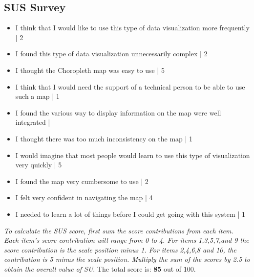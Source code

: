 \documentclass[twocolumn, letterpaper,13pt]{scrartcl}
\begin{document}
    \subsection*{SUS Survey}
    \begin{itemize}
        \item I think that I would like to use this type of data visualization more frequently | 2
        \item I found this type of data visualization unnecessarily complex | 2
        \item I thought the Choropleth map was easy to use | 5
        \item I think that I would need the support of a technical person to be able to use such a map | 1
        \item I found the various way to display information on the map were well integrated | %
        \item I thought there was too much inconsistency on the map | 1
        \item I would imagine that most people would learn to use this type of visualization very quickly | 5
        \item I found the map very cumbersome to use | 2
        \item I felt very confident in navigating the map | 4
        \item I needed to learn a lot of things before I could get going with this system | 1
    \end{itemize}
    
    \textit{To calculate the SUS score, first sum the score contributions from each item. Each item's score contribution will range from 0 to 4. For items 1,3,5,7,and 9 the score contribution is the scale position minus 1. For items 2,4,6,8 and 10, the contribution is 5 minus the scale position. Multiply the sum of the scores by 2.5 to obtain the overall value of SU}.
    \newline\newline
    The total score is: \textbf{85} out of 100.
    
\end{document}
